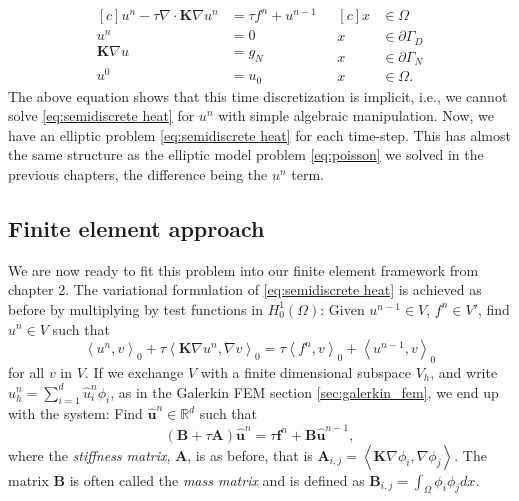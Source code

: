 \documentclass[../Main/main.tex]{subfiles}
\begin{document}
	\begin{equation}\label{eq:semidiscrete heat}
		\begin{aligned}[c]
			u^n - \tau \nabla \cdot \pmb{K} \nabla u^n &= \tau f^n+u^{n-1}\\
			u^n &= 0 \\
			\pmb{K}\nabla u &= g_N\\
			u^0 &= u_0
		\end{aligned}
		\ \ \
		\begin{aligned}[c]
			x &\in \Omega  \\
			x &\in \partial \Gamma_D \\
			x &\in \partial \Gamma_N \\
			x &\in \Omega .
		\end{aligned}
	\end{equation}
	The above equation shows that this time discretization is implicit, i.e., we cannot solve \eqref{eq:semidiscrete heat} for $u^n$ with simple algebraic manipulation.
	Now, we have an elliptic problem \eqref{eq:semidiscrete heat} for each time-step. This has almost the same structure as the elliptic model problem \eqref{eq:poisson} we solved in the previous chapters, the difference being the $u^n$ term.
	\subsection*{Finite element approach}
	We are now ready to fit this problem into our finite element framework from chapter 2.
	The variational formulation of \eqref{eq:semidiscrete heat} is achieved as before by multiplying by test functions in $H^1_0(\Omega)$: Given $u^{n-1} \in V$, $f^n \in V'$, find $u^n \in V$ such that
	\begin{equation}
			\left \langle  u^n, v\right \rangle_0 + \tau \left \langle  \pmb{K} \nabla u^n, \nabla v \right \rangle_0 =\tau \left \langle f^n,v\right \rangle_0 + \left \langle u^{n-1},v \right \rangle_0
	\end{equation}
	for all $v$ in $V$.
	If we exchange $V$ with  a finite dimensional subspace $V_h$, and write $u_h^n = \sum_{i = 1}^d \hat{u}_i^n \phi_i $, as in the Galerkin FEM section \ref{sec:galerkin_fem}, we end up with the system: Find $\hat{\bm{u}}^n\in \mathbb{R}^d$ such that 
	\begin{equation}\label{eq:heat fem disc}
			(\pmb{B}+\tau\pmb{A})\hat{\bm{u}}^n =\tau \pmb{f}^n +  \pmb{B}\hat{\bm{u}}^{n-1},
	\end{equation}
	where the \emph{stiffness matrix}, $\bm{A}$, is as before, that is $\bm{A}_{i,j} = \left \langle \bm{K} \nabla \phi_i,\nabla \phi_j \right \rangle$. The matrix $\bm{B}$ is often called the \emph{mass matrix} and is defined as $\pmb{B}_{i,j} = \int_{\Omega} \phi_i \phi_jdx$.
\end{document}
